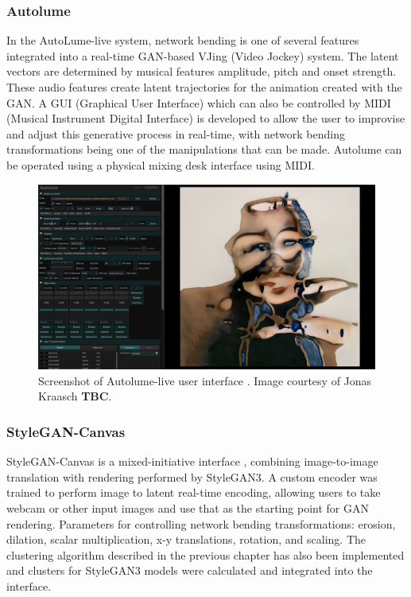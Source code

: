 \subsubsection{Autolume}

In the AutoLume-live system, \citep{kraasch2022autolume,kraasch2023autolume} network bending is one of several features integrated into a real-time GAN-based VJing (Video Jockey) system. 
The latent vectors are determined by musical features amplitude, pitch and onset strength. 
These audio features create latent trajectories for the animation created with the GAN. 
A GUI (Graphical User Interface) which can also be controlled by MIDI (Musical Instrument Digital Interface) is developed to allow the user to improvise and adjust this generative process in real-time, with network bending transformations being one of the manipulations that can be made. 
Autolume can be operated using a physical mixing desk interface using MIDI.

\begin{figure}[!htb]
    \centering
    \captionsetup{justification=centering}
    \includegraphics[width=1\textwidth]{figures/c7_impact/net-bend-technical/autolume-live.png}
    \caption[Autolume-live user interface]{Screenshot of Autolume-live user interface \citep{kraasch2023autolume}. Image courtesy of Jonas Kraasch \textbf{TBC}.}
    \label{fig:c7:autolume-live}
\end{figure}

\subsubsection{StyleGAN-Canvas}

StyleGAN-Canvas is a mixed-initiative interface \citep{zheng2023stylegan}, combining image-to-image translation with rendering performed by StyleGAN3. 
A custom encoder was trained to perform image to latent real-time encoding, allowing users to take webcam or other input images and use that as the starting point for GAN rendering. 
Parameters for controlling network bending transformations:  erosion, dilation, scalar multiplication, x-y translations, rotation, and scaling. 
The clustering algorithm described in the previous chapter has also been implemented and clusters for StyleGAN3 models were calculated and integrated into the interface.

